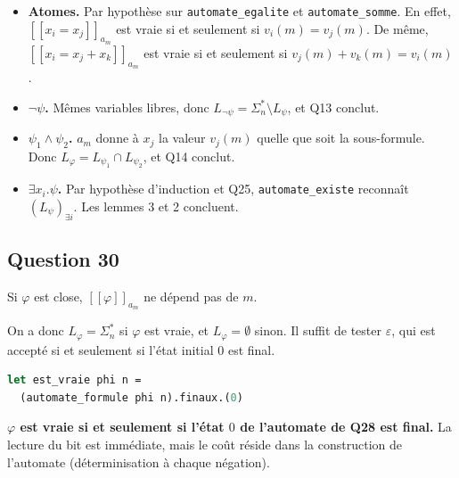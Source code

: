 \documentclass[11pt,a4paper]{article}
\providecommand{\tightlist}{\setlength{\itemsep}{0pt}\setlength{\parskip}{0pt}}
\begin{document}
\begin{itemize}
\tightlist
\item
  \textbf{Atomes.} Par hypothèse sur \texttt{automate\_egalite} et \texttt{automate\_somme}. En effet, \([\![x_i=x_j]\!]_{a_m}\) est vraie si et seulement si \(v_i(m)=v_j(m)\). De même, \([\![x_i=x_j+x_k]\!]_{a_m}\) est vraie si et seulement si \(v_j(m)+v_k(m)=v_i(m)\).
\item
  \textbf{\(\neg\psi\).} Mêmes variables libres, donc \(L_{\neg\psi}=\Sigma_n^*\setminus L_\psi\), et Q13 conclut.
\item
  \textbf{\(\psi_1\wedge\psi_2\).} \(a_m\) donne à \(x_j\) la valeur \(v_j(m)\) quelle que soit la sous-formule. Donc \(L_\varphi=L_{\psi_1}\cap L_{\psi_2}\), et Q14 conclut.
\item
  \textbf{\(\exists x_i.\psi\).} Par hypothèse d'induction et Q25, \texttt{automate\_existe} reconnaît \((L_\psi)_{\exists i}\). Les lemmes 3 et 2 concluent.
\end{itemize}

\hypertarget{question-30}{%
\subsection{Question 30}\label{question-30}}

Si \(\varphi\) est close, \([\![\varphi]\!]_{a_m}\) ne dépend pas de \(m\).

On a donc \(L_\varphi=\Sigma_n^*\) si \(\varphi\) est vraie, et \(L_\varphi=\emptyset\) sinon. Il suffit de tester \(\varepsilon\), qui est accepté si et seulement si l'état initial \(0\) est final.

\begin{lstlisting}[language=Caml]
let est_vraie phi n =
  (automate_formule phi n).finaux.(0)
\end{lstlisting}

\textbf{\(\varphi\) est vraie si et seulement si l'état \(0\) de l'automate de Q28 est final.} La lecture du bit est immédiate, mais le coût réside dans la construction de l'automate (déterminisation à chaque négation).
\end{document}
